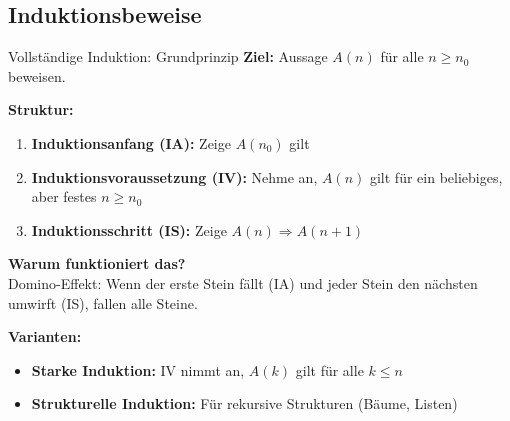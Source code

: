 \documentclass[a4paper, fontsize=7pt]{scrartcl}
\begin{document}
\subsection{Induktionsbeweise}

\begin{mainbox}{Vollständige Induktion: Grundprinzip}
\textbf{Ziel:} Aussage $A(n)$ für alle $n \geq n_0$ beweisen.

\textbf{Struktur:}
\begin{enumerate}
  \item \textbf{Induktionsanfang (IA):} Zeige $A(n_0)$ gilt
  \item \textbf{Induktionsvoraussetzung (IV):} Nehme an, $A(n)$ gilt für ein beliebiges, aber festes $n \geq n_0$
  \item \textbf{Induktionsschritt (IS):} Zeige $A(n) \Rightarrow A(n+1)$
\end{enumerate}

\textbf{Warum funktioniert das?}\\
Domino-Effekt: Wenn der erste Stein fällt (IA) und jeder Stein den nächsten umwirft (IS), fallen alle Steine.

\textbf{Varianten:}
\begin{itemize}
  \item \textbf{Starke Induktion:} IV nimmt an, $A(k)$ gilt für alle $k \leq n$
  \item \textbf{Strukturelle Induktion:} Für rekursive Strukturen (Bäume, Listen)
\end{itemize}
\end{mainbox}
\end{document}

